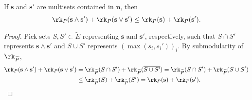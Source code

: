 \begin{lemm}\label{submodularity}
  If $\mathbf s$ and $\mathbf s'$ are multisets contained in $\mathbf n$, then
  \[
    \rk_{P}(\mathbf s \wedge \mathbf s') + \rk_{P}(\mathbf s \vee \mathbf s') \leq \rk_{P}(\mathbf s) + \rk_{P}(\mathbf s').
  \]
\end{lemm}
\begin{proof}
  Pick sets $S, S' \subset \widetilde E$ representing $\mathbf s$ and $\mathbf s'$, respectively, such that $S \cap S'$ represents $\mathbf s \wedge \mathbf s'$ and $S \cup S'$ represents $(\max(s_i, s_i'))_i$.
  By submodularity of $\rk_{\widetilde P}$,
  \begin{align*}
    \rk_{P}(\mathbf s \wedge \mathbf s') + \rk_{P}(\mathbf s \vee \mathbf s')
    &= \rk_{\widetilde P}(S \cap S') + \rk_{\widetilde P}(\overline{S \cup S'})
    = \rk_{\widetilde P}(S \cap S') + \rk_{\widetilde P}(S \cup S')\\
    &\leq \rk_{\widetilde P}(S) + \rk_{\widetilde P}(S')
    = \rk_{P}(\mathbf s) + \rk_{P}(\mathbf s'). \qedhere
  \end{align*}
\end{proof}

